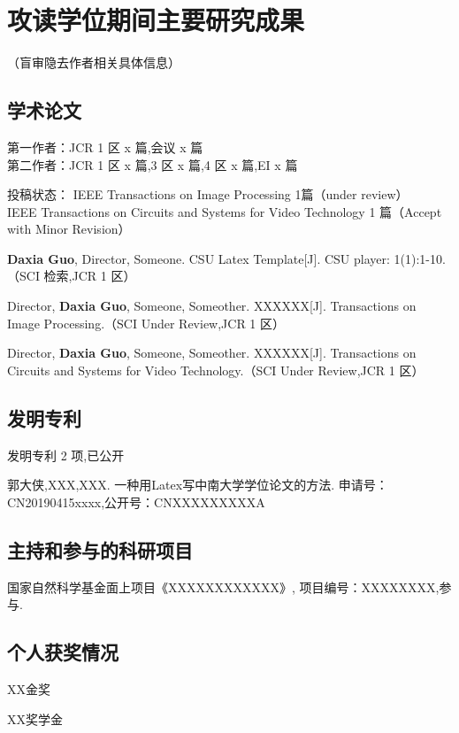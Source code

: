 \section{攻读学位期间主要研究成果} %

\ifblindreview
\noindent
（盲审隐去作者相关具体信息）
\fi
\subsection*{学术论文}

\ifblindreview

\noindent
第一作者：JCR 1 区 x 篇,会议 x 篇 \\{}
第二作者：JCR 1 区 x 篇,3 区 x 篇,4 区 x 篇,EI x 篇 

\noindent
投稿状态： 
IEEE Transactions on Image Processing 1篇（under review）\\{}
IEEE Transactions on Circuits and Systems for Video Technology 1 篇（Accept with Minor Revision）
\else
\begin{enumerate}[label={[\arabic*]}]
\item \textbf{Daxia Guo}, Director, Someone. CSU Latex Template[J]. CSU player: 1(1):1-10. （SCI 检索,JCR 1 区）
\item Director, \textbf{Daxia Guo}, Someone, Someother. XXXXXX[J]. Transactions on Image Processing.（SCI Under Review,JCR 1 区）
\item Director, \textbf{Daxia Guo}, Someone, Someother. XXXXXX[J]. Transactions on Circuits and Systems for Video Technology.（SCI Under Review,JCR 1 区）
\end{enumerate}
\fi
\subsection*{发明专利}
\ifblindreview
\noindent
发明专利 2 项,已公开
\else
\begin{enumerate}[label={[\arabic*]}]
\item 郭大侠,XXX,XXX. 一种用Latex写中南大学学位论文的方法. 申请号：CN20190415xxxx,公开号：CNXXXXXXXXXA
\end{enumerate}
\fi

\ifblindreview
\else
\subsection*{主持和参与的科研项目}
\begin{enumerate}[label={[\arabic*]}]
\item 国家自然科学基金面上项目《XXXXXXXXXXXX》, 项目编号：XXXXXXXX,参与.
\end{enumerate}

\subsection*{个人获奖情况}
\noindent
\begin{enumerate}[label={[\arabic*]}]
\item XX金奖
\item XX奖学金
\end{enumerate}
\fi

\newpage

\ifblindreview
\else

\newpage
\fi
